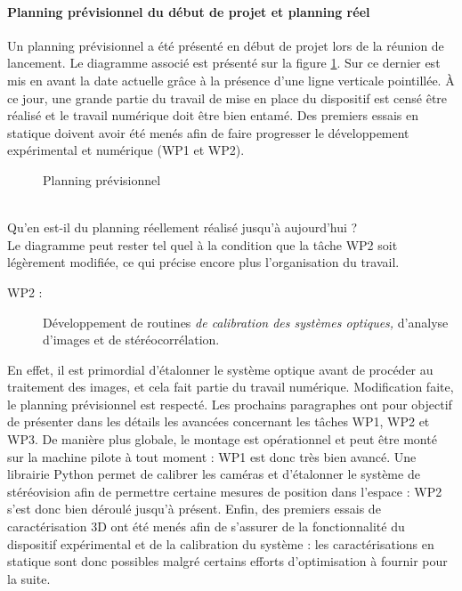 \documentclass[a4paper, 11pt]{article}
\begin{document}
	\paragraph{Planning prévisionnel du début de projet et planning réel\\}
	Un planning prévisionnel a été présenté en début de projet lors de la réunion de lancement. Le diagramme associé est présenté sur la figure \ref{fig:gantt_previsionnel}. Sur ce dernier est mis en avant la date actuelle grâce à la présence d'une ligne verticale pointillée. \`A ce jour, une grande partie du travail de mise en place du dispositif est censé être réalisé et le travail numérique doit être bien entamé. Des premiers essais en statique doivent avoir été menés afin de faire progresser le développement expérimental et numérique (WP1 et WP2).
	\begin{figure}\centering
		\caption{\label{fig:gantt_previsionnel}Planning prévisionnel}
	\end{figure}
	\\Qu'en est-il du planning réellement réalisé jusqu'à aujourd'hui ?
	\\Le diagramme peut rester tel quel à la condition que la tâche WP2 soit légèrement modifiée, ce qui précise encore plus l'organisation du travail.
	\begin{description}
		\item[WP2 :] Développement de routines \emph{de calibration des systèmes optiques,} d’analyse d’images et de stéréocorrélation.
	\end{description}
	En effet, il est primordial d'étalonner le système optique avant de procéder au traitement des images, et cela fait partie du travail numérique. Modification faite, le planning prévisionnel est respecté. Les prochains paragraphes ont pour objectif de présenter dans les détails les avancées concernant les tâches WP1, WP2 et WP3. De manière plus globale, le montage est opérationnel et peut être monté sur la machine pilote à tout moment : WP1 est donc très bien avancé. Une librairie Python permet de calibrer les caméras et d'étalonner le système de stéréovision afin de permettre certaine mesures de position dans l'espace : WP2 s'est donc bien déroulé jusqu'à présent. Enfin, des premiers essais de caractérisation 3D ont été menés afin de s'assurer de la fonctionnalité du dispositif expérimental et de la calibration du système : les caractérisations en statique sont donc possibles malgré certains efforts d'optimisation à fournir pour la suite.
\end{document}
